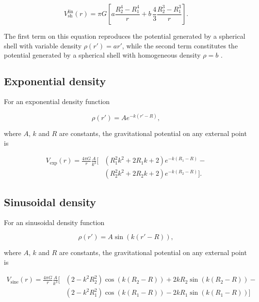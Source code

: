 \documentclass[extra, referee]{gji}
\begin{document}
\begin{equation}
    V_\text{sh}^\text{lin}(r) = \pi G \left[
    a \frac{R_2^4 - R_1^4}{r} +
    b \,\frac{4}{3} \frac{R_2^3 - R_1^3}{r} \right].
    \label{eq:shell-pot-linear}
\end{equation}

\noindent The first term on this equation reproduces the potential generated
by a spherical shell with variable density $\rho(r') = ar'$, while the second
term constitutes the potential generated by a spherical shell with homogeneous
density $\rho = b$ \citep{Mikuska2006,Grombein2013}.

\subsection{Exponential density}

For an exponential density function

\begin{equation}
    \rho(r') = A e^{- k (r' - R)},
\end{equation}

\noindent
where $A$, $k$ and $R$ are constants, the gravitational potential on any external point
is

\begin{equation}
    \begin{split}
    V_\text{exp}(r) = \frac{4\pi G}{r} \frac{A}{k^3} \Big[
    & \left( R_1^2 k^2 + 2 R_1 k + 2 \right) e^{- k (R_1 - R)} - \\
    & \left( R_2^2 k^2 + 2 R_2 k + 2 \right) e^{- k (R_2 - R)}
    \Big].
    \end{split}
\end{equation}


\subsection{Sinusoidal density}

For an sinusoidal density function

\begin{equation}
    \rho(r') = A \sin ( k (r' - R)),
\end{equation}

\noindent
where $A$, $k$ and $R$ are constants, the gravitational potential on any external point
is

\begin{equation}
    \begin{split}
    V_\text{sine}(r) = \frac{4\pi G}{r} \frac{A}{k^3} \Big[
    & (2 - k^2 R_2^2) \cos(k(R_2 - R)) + 2 k R_2 \sin(k(R_2 - R)) - \\
    & (2 - k^2 R_1^2) \cos(k(R_1 - R)) - 2 k R_1 \sin(k(R_1 - R))
        \Big]
    \end{split}
\end{equation}
\end{document}
